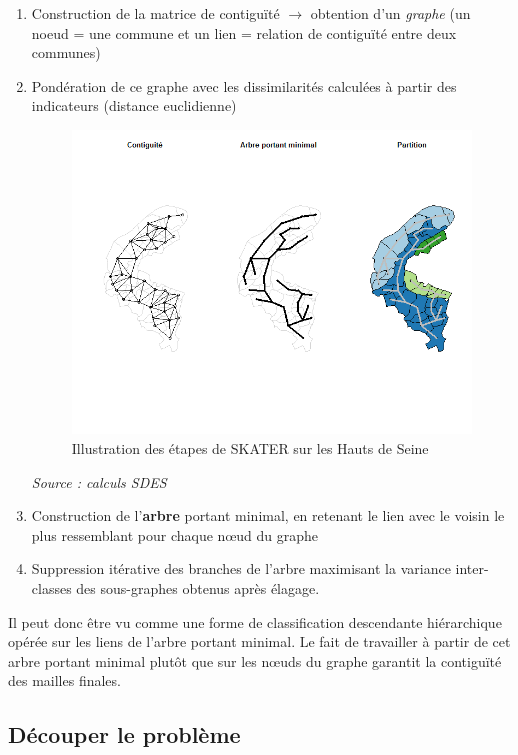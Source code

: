 \documentclass[12pt, a4paper]{article}
\begin{document}
\begin{enumerate}
\item Construction de la matrice de contiguïté $\rightarrow$ obtention d'un \emph{graphe} (un noeud = une commune et un lien = relation de contiguïté entre deux communes)
\item Pondération de ce graphe avec les dissimilarités calculées à partir des indicateurs (distance euclidienne)

\begin{figure}[H]
\caption{Illustration des étapes de SKATER sur les Hauts de Seine}
\begin{center}
\includegraphics[scale=.7]{img/SKATER.png}
\end{center}
\end{figure}
\emph{Source : calculs SDES}

\item Construction de l'\textbf{arbre} portant minimal, en retenant le lien avec le voisin le plus ressemblant pour chaque n\oe ud du graphe
\item Suppression itérative des branches de l'arbre maximisant la variance inter-classes des sous-graphes obtenus après élagage.
\end{enumerate}

Il peut donc être vu comme une forme de classification descendante hiérarchique opérée sur les liens de l'arbre portant minimal. Le fait de travailler à partir de cet arbre portant minimal plutôt que sur les n\oe uds du graphe garantit la contiguïté des mailles finales.


\subsection{Découper le problème}
\end{document}
